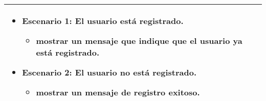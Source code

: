 \begin{table}[H]
{\begin{tabular}{|p{}|p{}|}
{\vspace{-\baselineskip}
\begin{itemize}[noitemsep]
    \item \textbf{Escenario 1:} El usuario está registrado.
    \vspace{-0.5\baselineskip}
    \begin{itemize}[noitemsep]
        \item mostrar un mensaje que indique que el usuario ya está registrado.
    \end{itemize}
    \item \textbf{Escenario 2:} El usuario no está registrado.
    \vspace{-0.5\baselineskip}
    \begin{itemize}[noitemsep]
        \item mostrar un mensaje de registro exitoso.
    \end{itemize}
\end{itemize}

}                                                                    \\ \hline
\end{tabular}%
}
\end{table}
